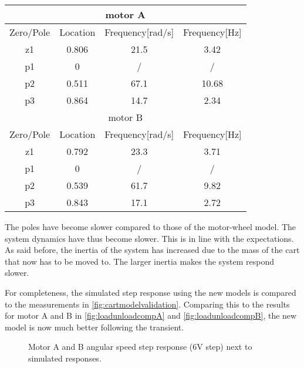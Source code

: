 \documentclass[a4paper]{article}
\newcommand{\newpar}{\vspace{.3cm}\noindent}
\begin{document}
\begin{center}
    \begin{tabular}{ |c|c|c|c|}
    \hline
    \multicolumn{4}{|c|}{motor A} \\
    \hline
    Zero/Pole & Location & Frequency{[}rad/s{]} & Frequency{[}Hz{]}  \\
    \hline
    z1        & 0.806    & 21.5                &  3.42           \\
    \hline
    p1        & 0         & /                   & /                 \\
    \hline
    p2        & 0.511   & 67.1                 & 10.68            \\
    \hline
    p3        & 0.864     & 14.7                  & 2.34 \\ 
    \hline
    \hline
    \multicolumn{4}{|c|}{motor B} \\
    \hline
    Zero/Pole & Location & Frequency{[}rad/s{]} & Frequency{[}Hz{]}  \\
    \hline
    z1        & 0.792    & 23.3                &    3.71         \\
    \hline
    p1        & 0         & /                   & /                 \\
    \hline
    p2        & 0.539   & 61.7                 &   9.82          \\
    \hline
    p3        & 0.843     & 17.1                  & 2.72           \\ 
    \hline
    \end{tabular}  
    \label{tab:location_Sys_31z_f}
\end{center}

\newpar 
The poles have become slower compared to those of the motor-wheel model. The system dynamics have thus become slower. This is in line with the expectations. As said before, the inertia of the system has increased due to the mass of the cart that now has to be moved to. The larger inertia makes the system respond slower.

\newpar
For completeness, the simulated step response using the new models is compared to the measurements in \autoref{fig:cartmodelvalidation}. Comparing this to the results for motor A and B in \autoref{fig:loadunloadcompA} and \autoref{fig:loadunloadcompB}, the new model is now much better following the transient.

\begin{figure}[H]
    \caption{Motor A and B angular speed step response (6V step) next to simulated responses.}
    \label{fig:cartmodelvalidation}
\end{figure}
\end{document}

